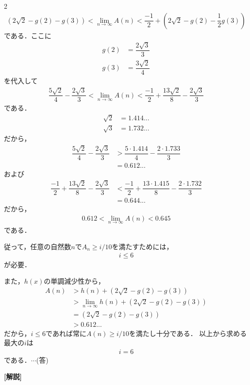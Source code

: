 \documentclass[../../main.tex]{subfiles}
\begin{document}
\begin{multicols}{2}
  \begin{align}
    \left(2\sqrt{2}-g(2)-g(3)\right) < \lim_{n\to\infty}A(n) < \dfrac{-1}{2}+ \left(2\sqrt{2}-g(2)-\dfrac{1}{2}g(3)\right)
  \end{align}
  である．ここに
  \begin{align}
    g(2) & = \dfrac{2\sqrt{3}}{3} \\
    g(3) & = \dfrac{3\sqrt{2}}{4}
  \end{align}
  を代入して
  \begin{align}
    \dfrac{5\sqrt{2}}{4} - \dfrac{2\sqrt{3}}{3} < \lim_{n\to\infty}A(n) < \dfrac{-1}{2} + \dfrac{13\sqrt{2}}{8} - \dfrac{2\sqrt{3}}{3}
  \end{align}
  である．
  \begin{align}
    \sqrt{2} & = 1.414... \\
    \sqrt{3} & = 1.732...
  \end{align}
  だから，
  \begin{align}
    \dfrac{5\sqrt{2}}{4} - \dfrac{2\sqrt{3}}{3}
    & >  \dfrac{5\cdot 1.414}{4} - \dfrac{2\cdot 1.733}{3} \\
    & = 0.612...
  \end{align}
  および
  \begin{align}
    \dfrac{-1}{2} + \dfrac{13\sqrt{2}}{8} - \dfrac{2\sqrt{3}}{3}
    & < \dfrac{-1}{2} + \dfrac{13\cdot 1.415}{8} - \dfrac{2\cdot 1.732}{3} \\
    & = 0.644...
  \end{align}
  だから，
  \begin{align}
    0.612 < \lim_{n\to\infty}A(n) < 0.645
  \end{align}
  である．

  従って，任意の自然数$n$で$A_n \ge i/10$を満たすためには，
  \begin{align}
    i\le 6
  \end{align}
  が必要．

  また，$h(x)$の単調減少性から，
  \begin{align}
    A(n)
    & > h(n) + \left(2\sqrt{2}-g(2)-g(3)\right)                  \\
    & > \lim_{n\to\infty}h(n) + \left(2\sqrt{2}-g(2)-g(3)\right) \\
    & = \left(2\sqrt{2}-g(2)-g(3)\right)                         \\
    & > 0.612...
  \end{align}
  だから，$i\le 6$であれば常に$A(n) \ge i/10$を満たし十分である．
  以上から求める最大の$i$は
  \begin{align}
    i=6
  \end{align}
  である．$\cdots$(答)

  {\bf [解説]}

  \newpage
\end{multicols}
\end{document}
